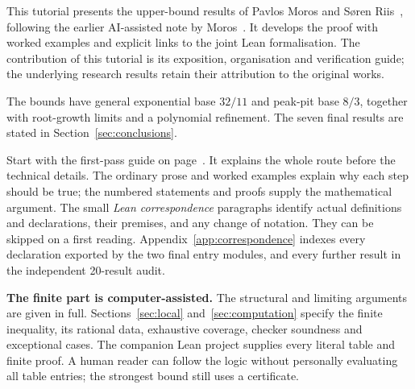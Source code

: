 This tutorial presents the upper-bound results of Pavlos Moros and
S\o ren Riis~\cite{joint}, following the earlier AI-assisted note by
Moros~\cite{moros}. It develops the proof with worked examples and
explicit links to the joint Lean formalisation. The contribution of
this tutorial is its exposition, organisation and verification guide;
the underlying research results retain their attribution to the
original works.

The bounds have general exponential base \(32/11\) and peak-pit base
\(8/3\), together with root-growth limits and a polynomial refinement.
The seven final results are stated in Section~\ref{sec:conclusions}.

Start with the first-pass guide on page~\pageref{sec:first-pass}.
It explains the whole route before the technical details. The ordinary prose and worked examples
explain why each step should be true; the numbered statements and proofs
supply the mathematical argument. The small \emph{Lean correspondence}
paragraphs identify actual definitions and declarations, their premises,
and any change of notation. They can be skipped on a first reading.
Appendix~\ref{app:correspondence} indexes every declaration exported by
the two final entry modules, and every further result in the independent
20-result audit.

\textbf{The finite part is computer-assisted.} The structural and
limiting arguments are given in full. Sections~\ref{sec:local}
and~\ref{sec:computation} specify the finite inequality, its rational
data, exhaustive coverage, checker soundness and exceptional cases.
The companion Lean project supplies every literal table and finite
proof. A human reader can follow the logic without personally
evaluating all table entries; the strongest bound still uses a certificate.

